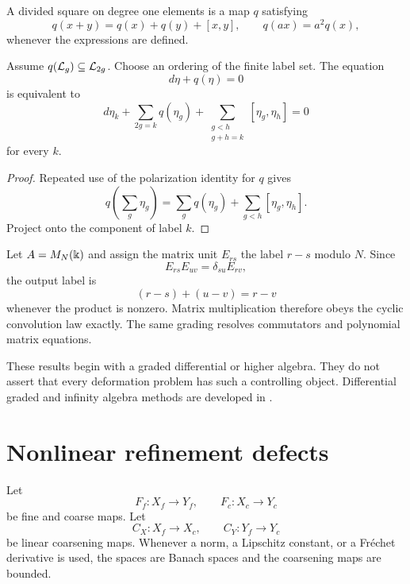 \begin{definition}\label{def:divided_square}
A divided square on degree one elements is a map $q$ satisfying
\[
q(x+y)=q(x)+q(y)+[x,y],
\qquad
q(ax)=a^2q(x),
\]
whenever the expressions are defined.
\end{definition}

\begin{proposition}\label{prop:divided_square_packets}
Assume $q(\mathcal L_g)\subseteq\mathcal L_{2g}$.  Choose an ordering of the finite label set.  The equation
\[
d\eta+q(\eta)=0
\]
is equivalent to
\[
d\eta_k
+
\sum_{2g=k}q(\eta_g)
+
\sum_{\substack{g<h\\g+h=k}}[\eta_g,\eta_h]
=0
\]
for every $k$.
\end{proposition}

\begin{proof}
Repeated use of the polarization identity for $q$ gives
\[
q\left(\sum_g\eta_g\right)
=
\sum_gq(\eta_g)
+
\sum_{g<h}[\eta_g,\eta_h].
\]
Project onto the component of label $k$.
\end{proof}


\begin{example}\label{ex:matrix_difference_grading}
Let $A=M_N(\Bbbk)$ and assign the matrix unit $E_{rs}$ the label $r-s$ modulo $N$.  Since
\[
E_{rs}E_{uv}=\delta_{su}E_{rv},
\]
the output label is
\[
(r-s)+(u-v)=r-v
\]
whenever the product is nonzero.  Matrix multiplication therefore obeys the cyclic convolution law exactly.  The same grading resolves commutators and polynomial matrix equations.
\end{example}

\begin{remark}\label{rem:graded_boundary}
These results begin with a graded differential or higher algebra.  They do not assert that every deformation problem has such a controlling object.  Differential graded and infinity algebra methods are developed in \cite{LodayVallette2012}.
\end{remark}

\section{Nonlinear refinement defects}\label{sec:nonlinear_defects}

Let
\[
F_f:X_f\longrightarrow Y_f,
\qquad
F_c:X_c\longrightarrow Y_c
\]
be fine and coarse maps.  Let
\[
C_X:X_f\longrightarrow X_c,
\qquad
C_Y:Y_f\longrightarrow Y_c
\]
be linear coarsening maps.  Whenever a norm, a Lipschitz constant, or a Fr\'echet derivative is used, the spaces are Banach spaces and the coarsening maps are bounded.

